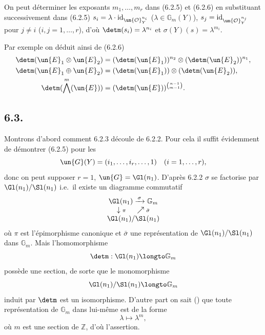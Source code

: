 \begin{remarque}[6.2.7]
On peut d\'eterminer les exposants $m_{1}, \dots, m_{r}$ dans (6.2.5) et (6.2.6) en substituant successivement dans (6.2.5) $s_{i} = \lambda \cdot \mathrm{id}_{\un{\mathcal{O}}_{Y}^{n_{i}}}$ ($\lambda \in \mathbb{G}_{m}(Y)$), $s_{j} = \mathrm{id}_{\un{\mathcal{O}}_{Y}^{n_{j}}}$ pour $j \neq i$ ($i, j = 1, \dots, r$), d'o\`u $\detm(s_{i}) = \lambda^{n_{i}}$ et $\sigma(Y)(s) = \lambda^{m_{i}}$.

Par exemple on d\'eduit ainsi de (6.2.6)
\begin{align}
\detm(\un{E}_{1} \otimes \un{E}_{2}) &= (\detm(\un{E}_{1}))^{n_{2}} \otimes (\detm(\un{E}_{2}))^{n_{1}}, \label{eq:6.2.8}\\
\detm(\un{E}_{1} \oplus \un{E}_{2}) &= (\detm(\un{E}_{1})) \otimes (\detm(\un{E}_{2})), \label{eq:6.2.9}\\
\detm(\bigwedge^{m}(\un{E})) &= (\detm(\un{E}))^{\binom{n-1}{m-1}}. \label{eq:6.2.10}
\end{align}
\end{remarque}

\subsection*{6.3.}

Montrons d'abord comment 6.2.3 d\'ecoule de 6.2.2. Pour cela il suffit \'evidemment de d\'emontrer (6.2.5) pour les
\[
\un{G}(Y) = (i_{1}, \dots, i_{r}, \dots, 1) \quad (i = 1, \dots, r),
\]
donc on peut supposer $r = 1$, $\un{G} = \Gl(n_{1})$. D'apr\`es 6.2.2 $\sigma$ se factorise par $\Gl(n_{1})/\Sl(n_{1})$ i.e.\ il existe un diagramme commutatif
\[
\begin{array}{cc}
\Gl(n_{1}) \xrightarrow{\,\sigma\,} \mathbb{G}_{m} \\
\downarrow{\scriptstyle \pi} \quad\; \nearrow{\scriptstyle \bar{\sigma}} \\
\Gl(n_{1})/\Sl(n_{1})
\end{array}
\]
o\`u $\pi$ est l'\'epimorphisme canonique et $\bar{\sigma}$ une repr\'esentation de $\Gl(n_{1})/\Sl(n_{1})$ dans $\mathbb{G}_{m}$. Mais l'homomorphisme
\[
\detm : \Gl(n_{1}) \longto \mathbb{G}_{m}
\]
poss\`ede une section, de sorte que le monomorphisme
\[
\Gl(n_{1})/\Sl(n_{1}) \longto \mathbb{G}_{m}
\]
induit par $\detm$ est un isomorphisme. D'autre part on sait () que toute repr\'esentation de $\mathbb{G}_{m}$ dans lui-m\^eme est de la forme
\[
\lambda \mapsto \lambda^{m},
\]
o\`u $m$ est une section de $\mathbb{Z}$, d'o\`u l'assertion.

